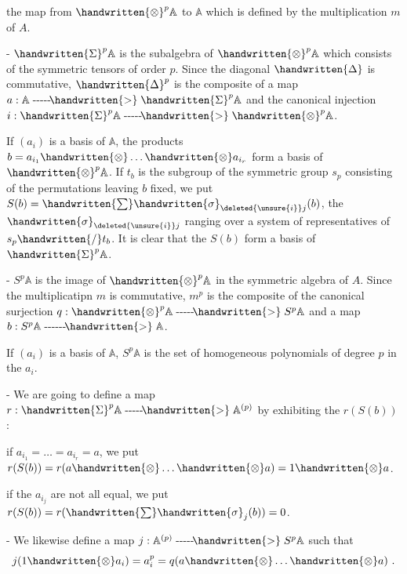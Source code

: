 the map from $\handwritten{\otimes}^{p}\mathbb{A}$ to $\mathbb{A}$ which is defined by the multiplication $m$ of $A$.

\noindent - $\handwritten{\Sigma}^{p}\mathbb{A}$ is the subalgebra of $\handwritten{\otimes}^{p}\mathbb{A}$ which consists of the symmetric tensors of order $p$. Since the diagonal $\handwritten{\Delta}$ is commutative, $\handwritten{\Delta}^{p}$ is the composite of a map $a:\mathbb{A}\mathrel{\text{-{}-{}-{}-{}-}\!\handwritten{>}}\handwritten{\Sigma}^{p}\mathbb{A}$ and the canonical injection $i:\handwritten{\Sigma}^{p}\mathbb{A}\mathrel{\text{-{}-{}-{}-{}-}\!\handwritten{>}}\handwritten{\otimes}^{p}\mathbb{A}$.

If $(a_i)$ is a basis of $\mathbb{A}$, the products $b=a_{i_1}\handwritten{\otimes}\ldots\handwritten{\otimes}a_{i_r}$ form a basis of $\handwritten{\otimes}^{p}\mathbb{A}$. If $t_b$ is the subgroup of the symmetric group $s_p$ consisting of the permutations leaving $b$ fixed, we put $S(b)=\handwritten{\sum}\handwritten{\sigma}_{\deleted{\unsure{i}}j}(b)$, the $\handwritten{\sigma}_{\deleted{\unsure{i}}j}$ ranging over a system of representatives of $s_p\handwritten{/}t_b$. It is clear that the $S(b)$ form a basis of $\handwritten{\Sigma}^{p}\mathbb{A}$.

\noindent - $S^{p}\mathbb{A}$ is the image of $\handwritten{\otimes}^{p}\mathbb{A}$ in the symmetric algebra of $A$. Since the multiplicatipn $m$ is commutative, $m^p$ is the composite of the canonical surjection $q:\handwritten{\otimes}^{p}\mathbb{A}\mathrel{\text{-{}-{}-{}-{}-}\!\handwritten{>}}S^p\mathbb{A}$ and a map $b:S^p\mathbb{A}\mathrel{\text{-{}-{}-{}-{}-{}-}\!\handwritten{>}}\mathbb{A}$.

If $(a_i)$ is a basis of $\mathbb{A}$, $S^p\mathbb{A}$ is the set of homogeneous polynomials of degree $p$ in the $a_i$.

\noindent - We are going to define a map $r:\handwritten{\Sigma}^{p}\mathbb{A}\mathrel{\text{-{}-{}-{}-{}-}\!\handwritten{>}}\mathbb{A}^{(p)}$ by exhibiting the $r(S(b))$ :

if $a_{i_1}=\ldots=a_{i_r}=a$, we put $r(S(b))=r(a\handwritten{\otimes}\ldots\handwritten{\otimes}a)=1\handwritten{\otimes}a$.

if the $a_{i_j}$ are not all equal, we put $r(S(b))=r(\handwritten{\sum}\handwritten{\sigma}_j(b))=0$.

\noindent - We likewise define a map $j:\mathbb{A}^{(p)}\mathrel{\text{-{}-{}-{}-{}-}\!\handwritten{>}}S^p\mathbb{A}$ such that
\[
j(1\handwritten{\otimes}a_i)=a_i^p=q(a\handwritten{\otimes}\ldots\handwritten{\otimes}a)\ .
\]
